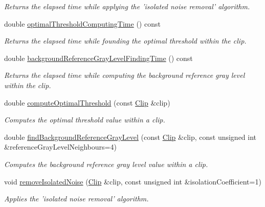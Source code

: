 \begin{CompactItemize}
\begin{CompactList}\small\item\em Returns the elapsed time while applying the 'isolated noise removal' algorithm. \item\end{CompactList}\item 
double \hyperlink{class_preprocessor_72dd29238c4202698e67dcb26a47f4b5}{optimalThresholdComputingTime} () const 
\begin{CompactList}\small\item\em Returns the elapsed time while founding the optimal threshold within the clip. \item\end{CompactList}\item 
double \hyperlink{class_preprocessor_3189cad5515476d54cc14effcf983fc7}{backgroundReferenceGrayLevelFindingTime} () const 
\begin{CompactList}\small\item\em Returns the elapsed time while computing the background reference gray level within the clip. \item\end{CompactList}\item 
double \hyperlink{class_preprocessor_2fbe202fbf9e7ef8f9951a24a3156230}{computeOptimalThreshold} (const \hyperlink{class_clip}{Clip} \&clip)
\begin{CompactList}\small\item\em Computes the optimal threshold value within a clip. \item\end{CompactList}\item 
double \hyperlink{class_preprocessor_1cd0543e1e41124a9dd26c99036ac62d}{findBackgroundReferenceGrayLevel} (const \hyperlink{class_clip}{Clip} \&clip, const unsigned int \&referenceGrayLevelNeighbours=4)
\begin{CompactList}\small\item\em Computes the background reference gray level value within a clip. \item\end{CompactList}\item 
void \hyperlink{class_preprocessor_a365f69af48cae608071e9943f300dd5}{removeIsolatedNoise} (\hyperlink{class_clip}{Clip} \&clip, const unsigned int \&isolationCoefficient=1)
\begin{CompactList}\small\item\em Applies the 'isolated noise removal' algorithm. \item\end{CompactList}\end{CompactItemize}
